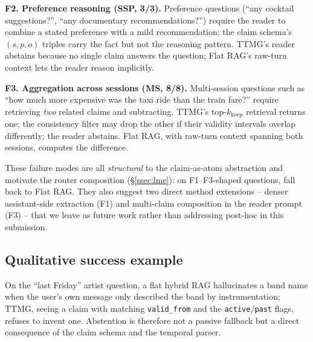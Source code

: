 \textbf{F2. Preference reasoning (SSP, 3/3).} Preference questions
(``any cocktail suggestions?'', ``any documentary recommendations?'')
require the reader to combine a stated preference with a mild
recommendation; the claim schema's $(s, p, o)$ triples carry the
fact but not the reasoning pattern. TTMG's reader abstains because
no single claim answers the question; Flat RAG's raw-turn context
lets the reader reason implicitly.

\textbf{F3. Aggregation across sessions (MS, 8/8).} Multi-session
questions such as ``how much more expensive was the taxi ride than
the train fare?'' require retrieving \emph{two} related claims and
subtracting. TTMG's top-$k_{\text{keep}}$ retrieval returns one;
the consistency filter may drop the other if their validity
intervals overlap differently; the reader abstains. Flat RAG, with
raw-turn context spanning both sessions, computes the difference.

These failure modes are all \emph{structural} to the
claim-as-atom abstraction and motivate the router composition
(\S\ref{ssec:lme}): on F1--F3-shaped questions, fall back to
Flat RAG. They also suggest two direct method extensions --
denser assistant-side extraction (F1) and multi-claim composition
in the reader prompt (F3) -- that we leave as future work rather
than addressing post-hoc in this submission.

\subsection{Qualitative success example}
On the ``last Friday'' artist question, a flat hybrid RAG
hallucinates a band name when the user's own message only described
the band by instrumentation; TTMG, seeing a claim with matching
\texttt{valid\_from} and the \texttt{active}/\texttt{past} flags,
refuses to invent one. Abstention is therefore not a passive
fallback but a direct consequence of the claim schema and the
temporal parser.
